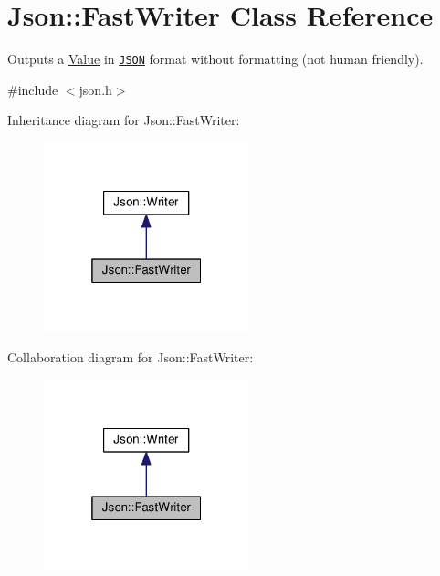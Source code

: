 \hypertarget{class_json_1_1_fast_writer}{}\section{Json\+:\+:Fast\+Writer Class Reference}
\label{class_json_1_1_fast_writer}


Outputs a \hyperlink{class_json_1_1_value}{Value} in \href{http://www.json.org}{\tt J\+S\+ON} format without formatting (not human friendly).  




{\ttfamily \#include $<$json.\+h$>$}



Inheritance diagram for Json\+:\+:Fast\+Writer\+:
\nopagebreak
\begin{figure}[H]
\begin{center}
\leavevmode
\includegraphics[width=169pt]{class_json_1_1_fast_writer__inherit__graph}
\end{center}
\end{figure}


Collaboration diagram for Json\+:\+:Fast\+Writer\+:
\nopagebreak
\begin{figure}[H]
\begin{center}
\leavevmode
\includegraphics[width=169pt]{class_json_1_1_fast_writer__coll__graph}
\end{center}
\end{figure}
